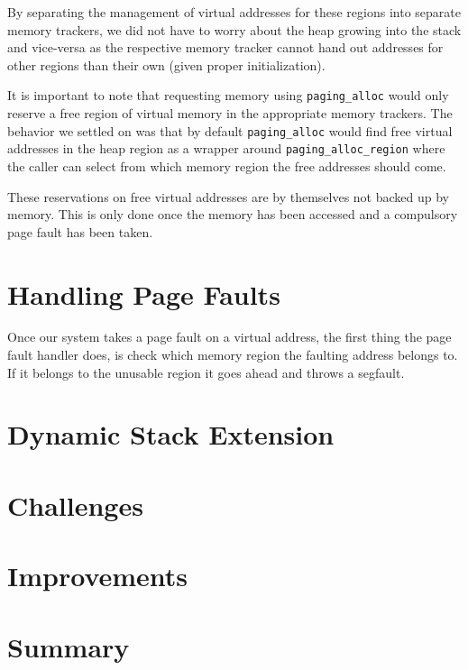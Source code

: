 By separating the management of virtual addresses for these regions into separate memory trackers,
we did not have to worry about the heap growing into the stack and vice-versa as the respective 
memory tracker cannot hand out addresses for other regions than their own (given proper initialization).

It is important to note that requesting memory using \texttt{paging_alloc} would only reserve a free region
of virtual memory in the appropriate memory trackers. The behavior we settled on was that by default
\texttt{paging_alloc} would find free virtual addresses in the heap region as a wrapper around
\texttt{paging_alloc_region} where the caller can select from which memory region the free addresses should come.

These reservations on free virtual addresses are by themselves not backed up by memory. This is only
done once the memory has been accessed and a compulsory page fault has been taken.

\section{Handling Page Faults}
Once our system takes a page fault on a virtual address, the first thing the page fault handler does,
is check which memory region the faulting address belongs to. If it belongs to the unusable region
it goes ahead and throws a segfault.

\section{Dynamic Stack Extension}

\section{Challenges}

\section{Improvements}

\section{Summary}